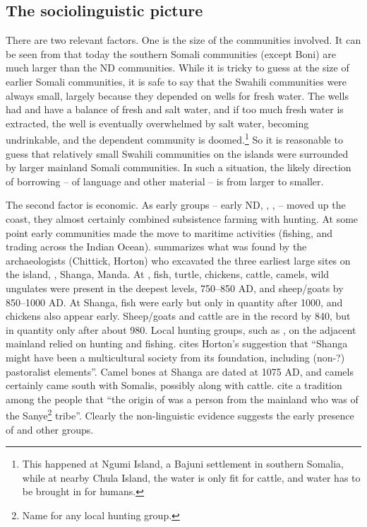 \documentclass[output=paper
,newtxmath
,modfonts
,nonflat]{langsci/langscibook}
\begin{document}
\subsection{The sociolinguistic picture}\label{sec:nurse:5.3} There are two relevant factors. One is the size of the communities involved. It can be seen from  that today the southern Somali communities (except Boni) are much larger than the ND communities. While it is tricky to guess at the size of earlier Somali communities, it is safe to say that the Swahili communities were always small, largely because they depended on wells for fresh water. The wells had and have a balance of fresh and salt water, and if too much fresh water is extracted, the well is eventually overwhelmed by salt water, becoming undrinkable, and the dependent community is doomed.\footnote{This happened at Ngumi Island, a Bajuni settlement in southern Somalia, while at nearby Chula Island, the water is only fit for cattle, and water has to be brought in for humans.}  So it is reasonable to guess that relatively small Swahili communities on the islands were surrounded by larger mainland Somali communities. In such a situation, the likely direction of borrowing – of language and other material – is from larger to smaller. 

  The second factor is economic. As early  groups – early ND, , ,  -- moved up the coast, they almost certainly combined subsistence farming with hunting. At some point early  communities made the move to maritime activities (fishing, and trading across the Indian Ocean). \citet{Wilson2016} summarizes what was found by the archaeologists \linebreak(Chittick, Horton) who excavated the three earliest large sites on the island, , Shanga, Manda. At , fish, turtle, chickens, cattle, camels, wild ungulates were present in the deepest levels, 750--850 AD, and sheep/goats by 850--1000 AD. At Shanga, fish were early but only in quantity after 1000, and chickens also appear early. Sheep/goats and cattle are in the record by 840, but in quantity only after about 980. Local hunting groups, such as , on the adjacent mainland relied on hunting and fishing. \citet[132]{Wilson2016} cites Horton’s suggestion that “Shanga might have been a multicultural society from its foundation, including (non-?) pastoralist elements”. Camel bones at Shanga are dated at 1075 AD, and camels certainly came south with Somalis, possibly along with cattle. \citet[72]{Nurse1985} cite a tradition among the  people that “the origin of  was a person from the mainland who was of the Sanye\footnote{Name for any local hunting group.} tribe”. Clearly the non-linguistic evidence suggests the early presence of  and other groups.
\end{document}
